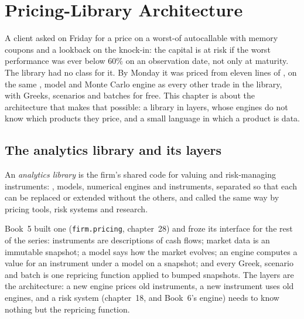 \chapter{Pricing-Library Architecture}\label{ch:pl:pricing-library-architecture}

A client asked on Friday for a price on a worst-of autocallable with memory coupons and a lookback on the knock-in: the capital is at risk
if the worst performance was ever below 60\% on an observation date, not only at maturity. The library had no class for it. By Monday it was
priced from eleven lines of , on the same , model and Monte Carlo engine as every other trade in the library, with
Greeks, scenarios and batches for free. This chapter is about the architecture that makes that possible: a library in layers, whose engines
do not know which products they price, and a small language in which a product is data.

\section{The analytics library and its layers}

\begin{definition}\label{def:pl:pricing-library-architecture:library}
An \emph{analytics library} is the firm's shared code for valuing and risk-managing instruments: ,
models, numerical engines and instruments, separated so that each can be replaced or extended without the others, and called the same way by
pricing tools, risk systems and research.
\end{definition}

Book~5 built one (\texttt{firm.pricing}, chapter~28) and froze its interface for the rest of the series: instruments are descriptions of
cash flows; market data is an immutable snapshot; a model says how the market evolves; an engine computes a value for an instrument under a
model on a snapshot; and every Greek, scenario and batch is one repricing function applied to bumped snapshots. The layers are the
architecture: a new engine prices old instruments, a new instrument uses old engines, and a risk system (chapter~18, and Book~6's engine)
needs to know nothing but the repricing function.

